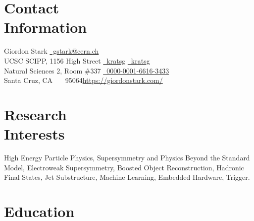 \documentclass[margin,line]{resume}
\let\origsection\section%
\let\section\subsection%
\let\section\origsection%
\begin{document}
\begin{resume}

\section{\mysidestyle Contact\\Information}

Giordon Stark                 \hfill \href{mailto:gstark@cern.ch}{~gstark@cern.ch}
\vspace{0mm}\\\vspace{0mm}%
UCSC SCIPP, 1156 High Street  \hfill \href{https://github.com/kratsg}{~kratsg} {\large\rmfamily\textbullet} \href{https://twitter.com/kratsg}{~kratsg}
\vspace{0mm}\\\vspace{0mm}%
Natural Sciences 2, Room \#337       \hfill \href{https://orcid.org/0000-0001-6616-3433}{~0000-0001-6616-3433}
\vspace{0mm}\\\vspace{0mm}%
Santa Cruz, CA \ \ \ 95064\hfill\href{https://giordonstark.com/?utm_source=cv}{https://giordonstark.com/}\\
\vspace{-6.5mm}%

\section{\mysidestyle Research\\Interests}
{\small
High Energy Particle Physics, Supersymmetry and Physics Beyond the Standard
  Model, Electroweak Supersymmetry, Boosted Object Reconstruction, Hadronic
  Final States, Jet Substructure, Machine Learning, Embedded Hardware, Trigger.
}
\section{\mysidestyle Education}


\end{resume}
\end{document}

